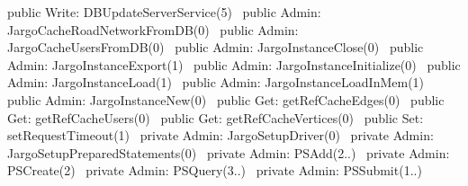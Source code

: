 public \LA{}Write: DBUpdateServerService(5)~{\nwtagstyle{}}\RA{}
\nwendcode{}\nwdocspar
{}
\nwenddocs{}\plusendmoddef
public \LA{}Admin: JargoCacheRoadNetworkFromDB(0)~{\nwtagstyle{}}\RA{}
public \LA{}Admin: JargoCacheUsersFromDB(0)~{\nwtagstyle{}}\RA{}
public \LA{}Admin: JargoInstanceClose(0)~{\nwtagstyle{}}\RA{}
public \LA{}Admin: JargoInstanceExport(1)~{\nwtagstyle{}}\RA{}
public \LA{}Admin: JargoInstanceInitialize(0)~{\nwtagstyle{}}\RA{}
public \LA{}Admin: JargoInstanceLoad(1)~{\nwtagstyle{}}\RA{}
public \LA{}Admin: JargoInstanceLoadInMem(1)~{\nwtagstyle{}}\RA{}
public \LA{}Admin: JargoInstanceNew(0)~{\nwtagstyle{}}\RA{}
public \LA{}Get: getRefCacheEdges(0)~{\nwtagstyle{}}\RA{}
public \LA{}Get: getRefCacheUsers(0)~{\nwtagstyle{}}\RA{}
public \LA{}Get: getRefCacheVertices(0)~{\nwtagstyle{}}\RA{}
public \LA{}Set: setRequestTimeout(1)~{\nwtagstyle{}}\RA{}
private \LA{}Admin: JargoSetupDriver(0)~{\nwtagstyle{}}\RA{}
private \LA{}Admin: JargoSetupPreparedStatements(0)~{\nwtagstyle{}}\RA{}
private \LA{}Admin: PSAdd(2..)~{\nwtagstyle{}}\RA{}
private \LA{}Admin: PSCreate(2)~{\nwtagstyle{}}\RA{}
private \LA{}Admin: PSQuery(3..)~{\nwtagstyle{}}\RA{}
private \LA{}Admin: PSSubmit(1..)~{\nwtagstyle{}}\RA{}
\nwendcode{}\nwdocspar

